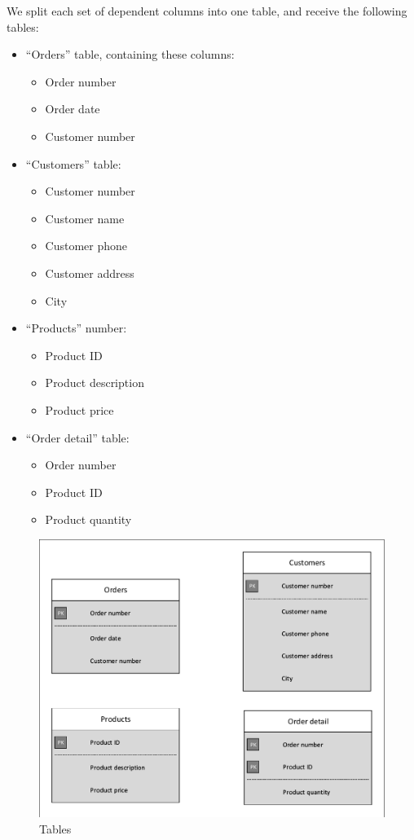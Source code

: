 \documentclass[12pt]{article}
\begin{document}
We split each set of dependent columns into one table, and receive the following tables:
\begin{itemize}
	\item ``Orders'' table, containing these columns:
		\begin{itemize}
			\item Order number
			\item Order date
			\item Customer number
		\end{itemize}
	\item ``Customers'' table:
		\begin{itemize}
			\item Customer number
			\item Customer name
			\item Customer phone
			\item Customer address
			\item City
		\end{itemize}
	\item ``Products'' number:
		\begin{itemize}
			\item Product ID
			\item Product description
			\item Product price
		\end{itemize}
	\item ``Order detail'' table:
		\begin{itemize}
			\item Order number
			\item Product ID
			\item Product quantity
		\end{itemize}
\end{itemize}

\begin{figure}[h]
    \centering
    \caption{Tables}
    \includegraphics[scale=0.9]{report9_tables.pdf}
\end{figure}

\end{document}
